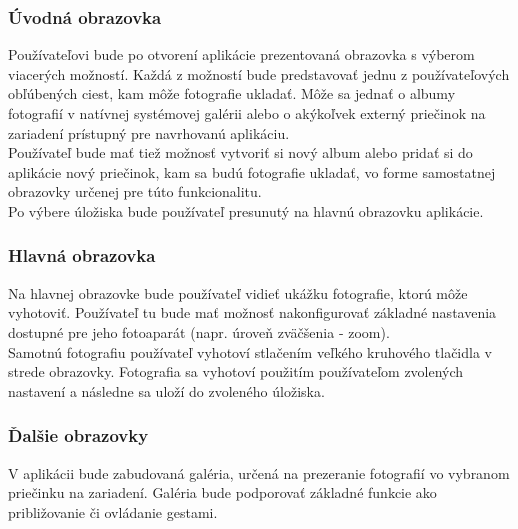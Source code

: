\documentclass[11pt]{article} %
\begin{document}
\subsubsection{Úvodná obrazovka}
Používateľovi bude po otvorení aplikácie prezentovaná obrazovka s výberom viacerých možností. Každá z možností bude predstavovať jednu z používateľových obľúbených ciest, kam môže fotografie ukladať. Môže sa jednať o albumy fotografií v natívnej systémovej galérii alebo o akýkoľvek externý priečinok na zariadení prístupný pre navrhovanú aplikáciu.\\
Používateľ bude mať tiež možnosť vytvoriť si nový album alebo pridať si do aplikácie nový priečinok, kam sa budú fotografie ukladať, vo forme samostatnej obrazovky určenej pre túto funkcionalitu.\\
Po výbere úložiska bude používateľ presunutý na hlavnú obrazovku aplikácie.\\
\subsubsection{Hlavná obrazovka}
Na hlavnej obrazovke bude používateľ vidieť ukážku fotografie, ktorú môže vyhotoviť. Používateľ tu bude mať možnosť nakonfigurovať základné nastavenia dostupné pre jeho fotoaparát (napr. úroveň zväčšenia - zoom).\\
Samotnú fotografiu používateľ vyhotoví stlačením veľkého kruhového tlačidla v strede obrazovky. Fotografia sa vyhotoví použitím používateľom zvolených nastavení a následne sa uloží do zvoleného úložiska.\\
\subsubsection{Ďalšie obrazovky}
V aplikácii bude zabudovaná galéria, určená na prezeranie fotografií vo vybranom priečinku na zariadení. Galéria bude podporovať základné funkcie ako približovanie či ovládanie gestami.
\end{document}
